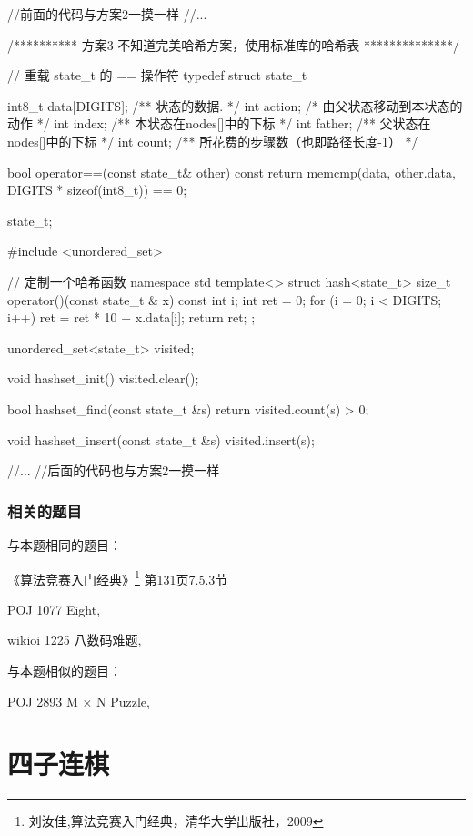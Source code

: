 \begin{Codex}[label=eight_digits_bfs3.cpp]
//前面的代码与方案2一摸一样
//...

/********** 方案3 不知道完美哈希方案，使用标准库的哈希表 **************/

// 重载 state_t 的 == 操作符
typedef struct state_t {
    int8_t data[DIGITS];  /** 状态的数据. */
    int action; /* 由父状态移动到本状态的动作 */
    int index;  /** 本状态在nodes[]中的下标 */
    int father; /** 父状态在nodes[]中的下标 */
    int count;  /** 所花费的步骤数（也即路径长度-1） */

    bool operator==(const state_t& other) const {
        return memcmp(data, other.data, DIGITS * sizeof(int8_t)) == 0;
    }
} state_t;

#include <unordered_set>

// 定制一个哈希函数
namespace std {
template<> struct hash<state_t> {
    size_t operator()(const state_t & x) const {
        int i;
        int ret = 0;
        for (i = 0; i < DIGITS; i++)
            ret = ret * 10 + x.data[i];
        return ret;
    }
};
}

unordered_set<state_t> visited;

void hashset_init() {
    visited.clear();
}

bool hashset_find(const state_t &s) {
    return visited.count(s) > 0;
}

void hashset_insert(const state_t &s) {
    visited.insert(s);
}

//...
//后面的代码也与方案2一摸一样
\end{Codex}

\subsubsection{相关的题目}
与本题相同的题目：
\begindot
\item 《算法竞赛入门经典》\footnote{刘汝佳,算法竞赛入门经典，清华大学出版社，2009} 第131页7.5.3节
\item  POJ 1077 Eight, 
\item  wikioi 1225 八数码难题, 
\myenddot

与本题相似的题目：
\begindot
\item  POJ 2893 M × N Puzzle, 
\myenddot


\section{四子连棋} %

